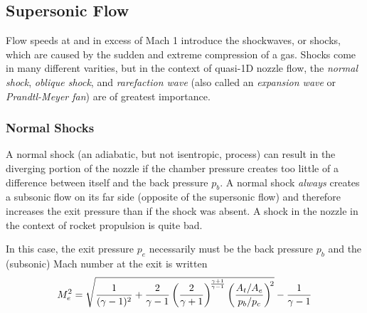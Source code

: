 \documentclass[11pt,dvipsnames]{thesis}
\begin{document}
\subsection{Supersonic Flow}
Flow speeds at and in excess of Mach 1 introduce the shockwaves, or shocks, which are caused by the sudden and extreme compression of a gas. Shocks come in many different varities, but in the context of quasi-1D nozzle flow, the \textit{normal shock}, \textit{oblique shock}, and \textit{rarefaction wave} (also called an \textit{expansion wave} or \textit{Prandtl-Meyer fan}) are of greatest importance.

\subsubsection{Normal Shocks}
A normal shock (an adiabatic, but not isentropic, process) can result in the diverging portion of the nozzle if the chamber pressure creates too little of a difference between itself and the back pressure $p_b$. A normal shock \textit{always} creates a subsonic flow on its far side (opposite of the supersonic flow) and therefore increases the exit pressure than if the shock was absent. A shock in the nozzle in the context of rocket propulsion is quite bad.

In this case, the exit pressure $p_e$ necessarily must be the back pressure $p_b$ and the (subsonic) Mach number at the exit is written
\begin{equation}
M_e^2 = \sqrt{
\vphantom{\left(\frac{2}{\gamma + 1}\right)^{\!\frac{\gamma + 1}{\gamma - 1}}}
\frac{1}{(\gamma - 1)^2} + \frac{2}{\gamma - 1} \left(\frac{2}{\gamma + 1}\right)^{\!\frac{\gamma + 1}{\gamma - 1}} \left(\frac{A_t/A_e}{p_b/p_c}\right)^{\!2}} - \frac{1}{\gamma - 1}
\end{equation}
\end{document}
